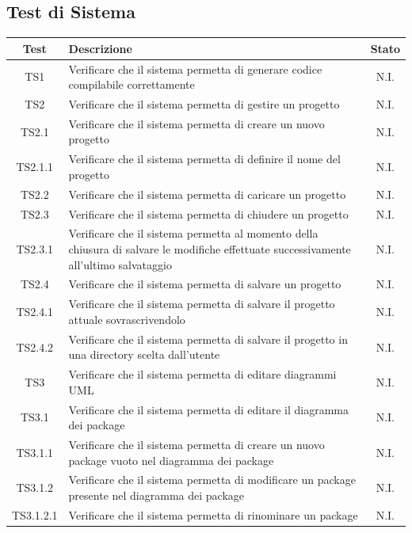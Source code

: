 \documentclass[../PianoDiQualifica.tex]{subfiles}
\begin{document}
\subsection{Test di Sistema}
\normalsize
\begin{longtable}{|c|>{\centering}p{10cm}|c|}
	\hline
	\textbf{Test} & \textbf{Descrizione} & \textbf{Stato}\\
	\hline
	\endhead
	
	TS1 & Verificare che il sistema permetta di generare codice compilabile correttamente & N.I. \\
	\hline
	TS2 & Verificare che il sistema permetta di gestire un progetto & N.I. \\
	\hline
	TS2.1 & Verificare che il sistema permetta di creare un nuovo progetto & N.I. \\
	\hline
	TS2.1.1 & Verificare che il sistema permetta di definire il nome del progetto & N.I. \\
	\hline
	TS2.2 & Verificare che il sistema permetta di caricare un progetto & N.I. \\
	\hline
	TS2.3 & Verificare che il sistema permetta di chiudere un progetto & N.I. \\
	\hline
	TS2.3.1 & Verificare che il sistema permetta al momento della chiusura di salvare le modifiche effettuate successivamente all'ultimo salvataggio & N.I. \\
	\hline
	TS2.4 & Verificare che il sistema permetta di salvare un progetto & N.I. \\
	\hline
	TS2.4.1 & Verificare che il sistema permetta di salvare il progetto attuale sovrascrivendolo & N.I. \\
	\hline
	TS2.4.2 & Verificare che il sistema permetta di salvare il progetto in una directory scelta dall'utente & N.I. \\
	\hline
	TS3 & Verificare che il sistema permetta di editare diagrammi UML & N.I. \\
	\hline
	TS3.1 & Verificare che il sistema permetta di editare il diagramma dei package & N.I. \\
	\hline
	TS3.1.1 & Verificare che il sistema permetta di creare un nuovo package vuoto nel diagramma dei package & N.I. \\
	\hline
	TS3.1.2 & Verificare che il sistema permetta di modificare un package presente nel diagramma dei package & N.I. \\
	\hline
	TS3.1.2.1 & Verificare che il sistema permetta di rinominare un package & N.I. \\

\end{longtable}
\end{document}
